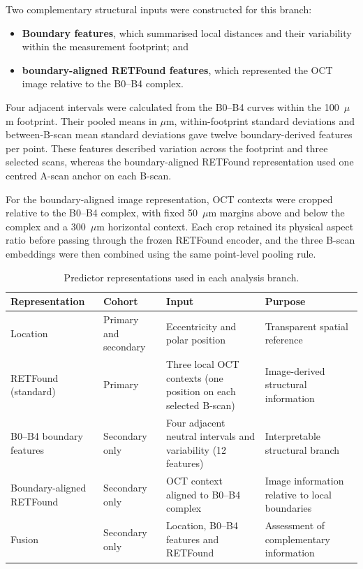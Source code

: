 Two complementary structural inputs were constructed for this branch:
\begin{itemize}[nosep]
  \item \textbf{Boundary features}, which summarised local distances and their variability within the measurement footprint; and
  \item \textbf{boundary-aligned RETFound features}, which represented the OCT image relative to the B0--B4 complex.
\end{itemize}

Four adjacent intervals were calculated from the B0--B4 curves within the 100~$\mu$m footprint. Their pooled means in $\mu$m, within-footprint standard deviations and between-B-scan mean standard deviations gave twelve boundary-derived features per point. These features described variation across the footprint and three selected scans, whereas the boundary-aligned RETFound representation used one centred A-scan anchor on each B-scan.

For the boundary-aligned image representation, OCT contexts were cropped relative to the B0--B4 complex, with fixed 50~$\mu$m margins above and below the complex and a 300~$\mu$m horizontal context. Each crop retained its physical aspect ratio before passing through the frozen RETFound encoder, and the three B-scan embeddings were then combined using the same point-level pooling rule.

\begin{table}[htbp]
\centering
\caption{Predictor representations used in each analysis branch.}
\label{tab:representations}
\begin{tabularx}{\textwidth}{p{}p{}p{}X}
\toprule
Representation & Cohort & Input & Purpose \\
\midrule
Location & Primary and secondary & Eccentricity and polar position & Transparent spatial reference \\
RETFound (standard) & Primary & Three local OCT contexts (one position on each selected B-scan) & Image-derived structural information \\
B0--B4 boundary features & Secondary only & Four adjacent neutral intervals and variability (12 features) & Interpretable structural branch \\
Boundary-aligned RETFound & Secondary only & OCT context aligned to B0--B4 complex & Image information relative to local boundaries \\
Fusion & Secondary only & Location, B0--B4 features and RETFound & Assessment of complementary information \\
\bottomrule
\end{tabularx}
\end{table}

